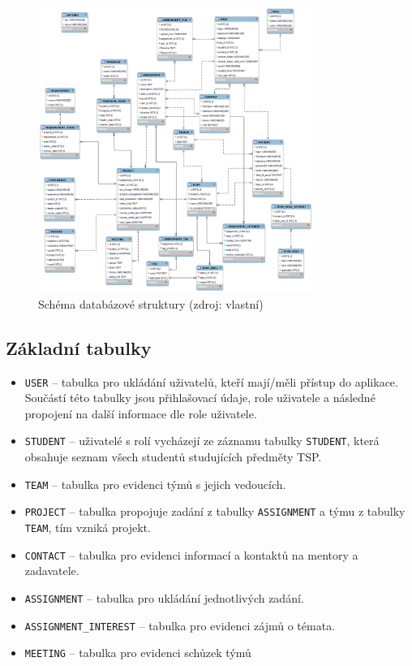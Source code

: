 \documentclass[czech,BP]{thesiskiv}
\begin{document}
		\begin{figure}[H]
			\centering
			\includegraphics[width=0.8\textwidth]{img/database/database_model}
			\caption{Schéma databázové struktury (zdroj: vlastní)}
			\label{fig:strukturaDB}
		\end{figure}
		\subsection{Základní tabulky}
			\begin{itemize}
				\item \texttt{USER} -- tabulka pro ukládání uživatelů, kteří mají/měli přístup do aplikace. Součástí této tabulky jsou přihlašovací údaje, role uživatele a následné propojení na další informace dle role uživatele.
				\item \texttt{STUDENT} -- uživatelé s rolí  vycházejí ze záznamu tabulky \texttt{STUDENT}, která obsahuje seznam všech studentů studujících předměty TSP.
				\item \texttt{TEAM} -- tabulka pro evidenci týmů s jejich vedoucích.
				\item \texttt{PROJECT} -- tabulka propojuje zadání z tabulky \texttt{ASSIGNMENT} a týmu z tabulky \texttt{TEAM}, tím vzniká projekt.
				\item \texttt{CONTACT} -- tabulka pro evidenci informací a kontaktů na mentory a zadavatele.
				\item \texttt{ASSIGNMENT} -- tabulka pro ukládání jednotlivých zadání.
				\item \texttt{ASSIGNMENT\_INTEREST} -- tabulka pro evidenci zájmů o témata.
				\item \texttt{MEETING} -- tabulka pro evidenci schůzek týmů
			\end{itemize}
\end{document}
